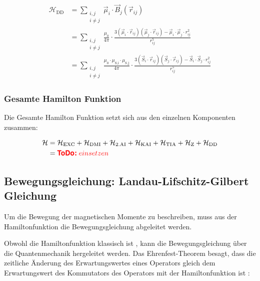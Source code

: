 \documentclass[main.tex]{subfiles}
\begin{document}
\begin{align}
	\mathcal{H}_{\text{DD}} & = \sum_{\substack{i,j                     \\
	i \neq j}}
	\vec{\mu}_i \cdot \vec{B}_j(\vec{r}_{ij}) \nonumber                 \\
	                        & = \sum_{\substack{i,j                     \\
	i \neq j}}
	\frac{\mu_0}{4\pi}
	\cdot  \frac{3(\vec{\mu}_i \cdot \vec{r}_{ij})(\vec{\mu}_j \cdot
		\vec{r}_{ij})
	- \vec{\mu}_i \cdot \vec{\mu}_j \cdot r_{ij}^2}{r_{ij}^5} \nonumber \\
	                        & = \sum_{\substack{i,j                     \\
	i \neq j}}
	\frac{\mu_0 \cdot \mu_{\text{S,i}} \cdot \mu_{\text{S,j}}}{4\pi}
	\cdot \frac{3(\vec{S}_i \cdot \vec{r}_{ij})(\vec{S}_j \cdot
		\vec{r}_{ij})
		- \vec{S}_i \cdot \vec{S}_j \cdot
		r_{ij}^2}{r_{ij}^5}\label{eq:hamilton-dd}
\end{align}

\subsubsection*{Gesamte Hamilton Funktion}

Die Gesamte Hamilton Funktion setzt sich aus den einzelnen Komponenten
zusammen:

\begin{align}
	\mathcal{H} & = \mathcal{H}_{\text{EXC}} + \mathcal{H}_{\text{DMI}} +
	\mathcal{H}_{\text{2.AI}} + \mathcal{H}_{\text{KAI}} +
	\mathcal{H}_{\text{TIA}} + \mathcal{H}_{\text{Z}} +
	\mathcal{H}_{\text{DD}}\label{eq:hamilton}
	\\
	            & = \todo{einsetzen}
\end{align}

\subsection{Bewegungsgleichung: Landau-Lifschitz-Gilbert Gleichung}
Um die Bewegung der magnetischen Momente zu beschreiben, muss aus der
Hamiltonfunktion die Bewegungsgleichung abgeleitet werden.

Obwohl die Hamiltonfunktion klassisch ist ,
kann die Bewegungsgleichung über die
Quantenmechanik hergeleitet werden. Das Ehrenfest-Theorem besagt, dass die
zeitliche Änderung des Erwartungswertes eines Operators gleich dem
Erwartungswert des Kommutators des Operators mit der Hamiltonfunktion ist
\cite{qm-1-Schwabl}:
\end{document}
